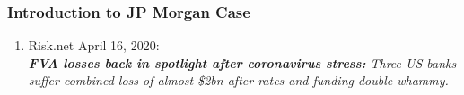 \documentclass[main.tex]{subfiles}
\begin{document}
    \begin{frame}
        \frametitle{Introduction to JP Morgan Case}

        \begin{enumerate}
            \item Risk.net April 16, 2020: \\
            \textit{%
                \textbf{FVA losses back in spotlight after coronavirus stress:} 
                Three US banks suffer combined loss of almost 
                \$2bn after rates and funding double whammy.
            }
        \end{enumerate}
    \end{frame}
\end{document}
